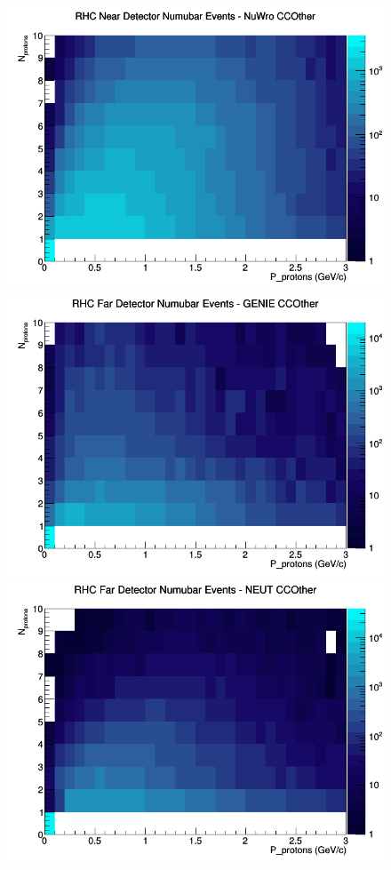 \documentclass[12pt]{article}
\begin{document}
\begin{figure}[h]
\includegraphics[width=\linewidth]{N_P/nominal/protons/CCOther_RHC_ND_numubar_N_P_NuWro.png}
\endminipage
\newline
{}
\includegraphics[width=\linewidth]{N_P/nominal/protons/CCOther_RHC_FD_numubar_N_P_GENIE.png}
\endminipage
{}
\includegraphics[width=\linewidth]{N_P/nominal/protons/CCOther_RHC_FD_numubar_N_P_NEUT.png}

\end{figure}
\end{document}
